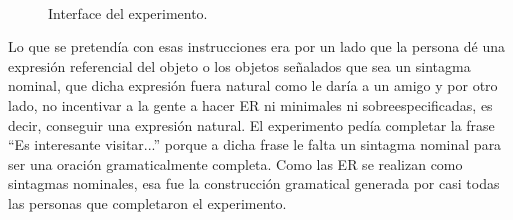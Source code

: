 \begin{figure}[h]
\begin{center}
\\[0pt]
\caption{Interface del experimento.}
\label{fig_interface}
\end{center}
\end{figure}


Lo que se pretend\'ia con esas instrucciones era por un lado que la persona d\'e una expresi\'on referencial del objeto o los objetos se\~nalados que sea un sintagma nominal, que dicha expresi\'on fuera natural como le dar\'ia a un amigo y por otro lado, no incentivar a la gente a hacer ER ni minimales ni sobreespecificadas, es decir, conseguir una expresi\'on natural. 
El experimento ped\'ia completar la frase ``Es interesante visitar...'' porque a dicha frase le falta un sintagma nominal para ser una oraci\'on gramaticalmente completa. Como las ER se realizan como sintagmas nominales, esa fue la construcci\'on gramatical generada por casi todas las personas que completaron el experimento.

